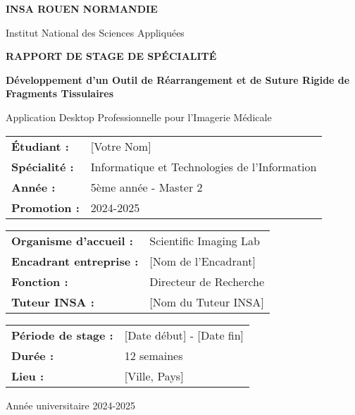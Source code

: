 \documentclass[12pt,a4paper]{article}
\begin{document}
\begin{titlepage}
\centering

\vspace*{0.5cm}

{\Large \textbf{INSA ROUEN NORMANDIE}}

\vspace{0.5cm}

{\large Institut National des Sciences Appliquées}

\vspace{1.5cm}

{\LARGE \textbf{RAPPORT DE STAGE DE SPÉCIALITÉ}}

\vspace{1cm}

{\Large \textbf{Développement d'un Outil de Réarrangement et de Suture Rigide de Fragments Tissulaires}}

\vspace{0.8cm}

{\large Application Desktop Professionnelle pour l'Imagerie Médicale}

\vspace{2cm}

\begin{tabular}{ll}
\textbf{Étudiant :} & [Votre Nom] \\
\textbf{Spécialité :} & Informatique et Technologies de l'Information \\
\textbf{Année :} & 5ème année - Master 2 \\
\textbf{Promotion :} & 2024-2025 \\
\end{tabular}

\vspace{1.5cm}

\begin{tabular}{ll}
\textbf{Organisme d'accueil :} & Scientific Imaging Lab \\
\textbf{Encadrant entreprise :} & [Nom de l'Encadrant] \\
\textbf{Fonction :} & Directeur de Recherche \\
\textbf{Tuteur INSA :} & [Nom du Tuteur INSA] \\
\end{tabular}

\vspace{1.5cm}

\begin{tabular}{ll}
\textbf{Période de stage :} & [Date début] - [Date fin] \\
\textbf{Durée :} & 12 semaines \\
\textbf{Lieu :} & [Ville, Pays] \\
\end{tabular}

\vfill

{\large Année universitaire 2024-2025}

\end{titlepage}
\end{document}
